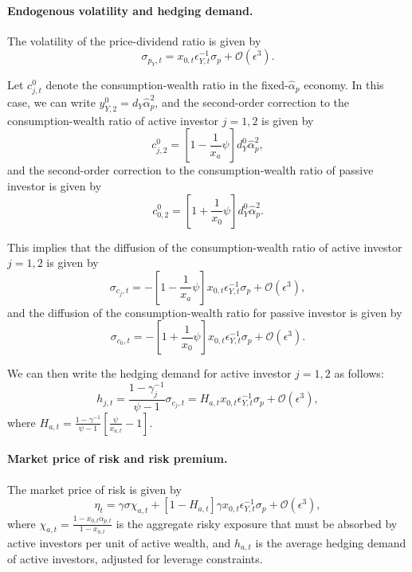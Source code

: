 \paragraph{Endogenous volatility and hedging demand.} The volatility of the price-dividend ratio is given by
\begin{equation}
    \sigma_{p_Y,t} = x_{0,t} \epsilon_{Y,t}^{-1} \sigma_p + \mathcal{O}(\epsilon^3).
\end{equation}

Let $c_{j,t}^0$ denote the consumption-wealth ratio in the fixed-$\hat{\alpha}_p$ economy.
In this case, we can write $y_{Y,2}^0 = d_Y \hat{\alpha}_p^2$, and the second-order correction to the consumption-wealth ratio of active investor $j=1,2$ is given by
\begin{equation}
    c_{j,2}^0 = \left[1 - \frac{1}{x_a} \psi \right] d_Y^0 \hat{\alpha}_p^2,
\end{equation}
and the second-order correction to the consumption-wealth ratio of passive investor is given by
\begin{equation}
    c_{0,2}^0 =  \left[1 + \frac{1}{x_0} \psi \right] d_Y^0 \hat{\alpha}_p^2.
\end{equation}

This implies that the diffusion of the consumption-wealth ratio of active investor $j=1,2$ is given by
\begin{equation}
    \sigma_{c_j,t} = - \left[1 - \frac{1}{x_a} \psi \right] x_{0,t} \epsilon_{Y,t}^{-1} \sigma_p + \mathcal{O}(\epsilon^3),
\end{equation}
and the diffusion of the consumption-wealth ratio for passive investor is given by
\begin{equation}
    \sigma_{c_0,t} =  -\left[1 + \frac{1}{x_0} \psi \right] x_{0,t} \epsilon_{Y,t}^{-1} \sigma_p + \mathcal{O}(\epsilon^3).
\end{equation}

We can then write the hedging demand for active investor $j=1,2$ as follows:
\begin{equation}
    h_{j,t} = \frac{1-\gamma_j^{-1}}{\psi-1} \sigma_{c_j,t} = H_{a,t} x_{0,t} \epsilon_{Y,t}^{-1} \sigma_p + \mathcal{O}(\epsilon^3),
\end{equation}
where $H_{a,t} = \frac{1-\gamma^{-1}}{\psi-1} \left[\frac{\psi }{x_{a,t}} -1\right]$.


\paragraph{Market price of risk and risk premium.} The market price of risk is given by
\begin{equation}
    \eta_t = \gamma \sigma \chi_{a,t}+ \left[1 - H_{a,t} \right] \gamma x_{0,t} \epsilon_{Y,t}^{-1} \sigma_p + \mathcal{O}(\epsilon^3),
\end{equation}
where $\chi_{a,t} = \frac{1-x_{0,t}\overline{\alpha}_{p,t}}{1-x_{0,t}}$ is the aggregate risky exposure that must be absorbed by active investors per unit of active wealth, and $h_{a,t}$ is the average hedging demand of active investors, adjusted for leverage constraints.

